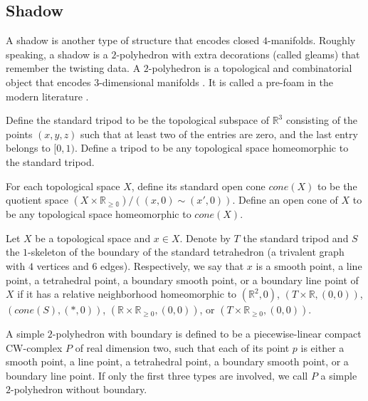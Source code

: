 \subsection{Shadow}


\noindent A shadow is another type of structure that encodes
closed $4$-manifolds. Roughly speaking, a shadow is a
$2$-polyhedron with extra decorations (called gleams) that
remember the twisting data. A $2$-polyhedron is a topological and
combinatorial object that encodes $3$-dimensional manifolds
\cite{matveev/algorithmic-topology-and-classification-of-3-manifolds}.
It is called a pre-foam in the modern literature
\cite{khovanov-robert/foam}.

\begin{definition}[tripod]\label{def/tripod}
  Define the standard tripod to be the topological subspace of
  $\mathbb{R}^{3}$ consisting of the points $(x,y,z)$ such that
  at least two of the entries are zero, and the last entry
  belongs to $[0,1)$. Define a tripod to be any topological space
  homeomorphic to the standard tripod.
\end{definition}

\begin{definition}[cone]\label{def/cone}
  For each topological space $X$, define its standard open cone
  $cone(X)$ to be the quotient space
  $(X \times \mathbb{R_{\geq 0}})/((x,0) \sim (x',0)).$ Define an
  open cone of $X$ to be any topological space homeomorphic to
  $cone(X)$.
\end{definition}

\begin{definition}\label{def/local-shape}
  Let $X$ be a topological space and $x \in X$. Denote by $T$ the
  standard tripod and $S$ the $1$-skeleton of the boundary of the
  standard tetrahedron (a trivalent graph with $4$ vertices and
  $6$ edges). Respectively, we say that $x$ is a smooth point, a
  line point, a tetrahedral point, a boundary smooth point, or a
  boundary line point of $X$ if it has a relative neighborhood
  homeomorphic to $(\mathbb{R}^{2},0)$,
  $(T \times \mathbb{R}, (0, 0))$, $(cone(S), (*, 0))$,
  $(\mathbb{R} \times \mathbb{R}_{\geq 0}, (0, 0))$, or
  $(T \times \mathbb{R}_{\geq 0}, (0, 0))$.
\end{definition}

\begin{definition}\label{def/simple-2-polyhedron}
  A simple $2$-polyhedron with boundary is defined to be a
  piecewise-linear compact CW-complex $P$ of real dimension two,
  such that each of its point $p$ is either a smooth point, a
  line point, a tetrahedral point, a boundary smooth point, or a
  boundary line point. If only the first three types are
  involved, we call $P$ a simple $2$-polyhedron without boundary.
\end{definition}

